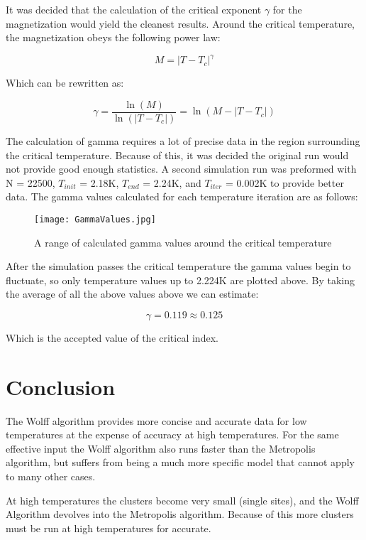 \documentclass[10pt,letterpaper]{article}
\begin{document}
It was decided that the calculation of the critical exponent $\gamma$ for the magnetization would yield the cleanest results. Around the critical temperature, the magnetization obeys the following power law:

\begin{equation}
M = |T - T_{c}|^{\gamma}
\end{equation}

Which can be rewritten as:

\begin{equation}
\gamma = \frac{\ln(M)}{\ln(|T - T_{c}|)} = \ln(M - |T - T_{c}|)
\end{equation}

The calculation of gamma requires a lot of precise data in the region surrounding the critical temperature. Because of this, it was decided the original run would not provide good enough statistics. A second simulation run was preformed with N = 22500, $T_{init}$ = 2.18K, $T_{end}$ = 2.24K, and $T_{iter}$ = 0.002K to provide better data. The gamma values calculated for each temperature iteration are as follows:

\begin{figure}[H]
\centering
\texttt{[image: GammaValues.jpg]}
\caption{A range of calculated gamma values around the critical temperature}
\end{figure}

After the simulation passes the critical temperature the gamma values begin to fluctuate, so only temperature values up to 2.224K are plotted above. By taking the average of all the above values above we can estimate:

\begin{equation}
\gamma = 0.119 \approx 0.125
\end{equation}

Which is the accepted value of the critical index.

\section{Conclusion}

The Wolff algorithm provides more concise and accurate data for low temperatures at the expense of accuracy at high temperatures. For the same effective input the Wolff algorithm also runs faster than the Metropolis algorithm, but suffers from being a much more specific model that cannot apply to many other cases.

At high temperatures the clusters become very small (single sites), and the Wolff Algorithm devolves into the Metropolis algorithm. Because of this more clusters must be run at high temperatures for accurate.
\end{document}
